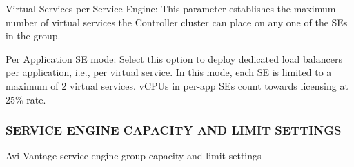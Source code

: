 \documentclass[letterpaper,10pt,english]{sphinxmanual}
\begin{document}
Virtual Services per Service Engine: This parameter establishes the maximum number of virtual services the Controller cluster can place on any one of the SEs in the group.

Per Application SE mode: Select this option to deploy dedicated load balancers per application, i.e., per virtual service. In this mode, each SE is limited to a maximum of 2 virtual services. vCPUs in per-app SEs count towards licensing at 25\% rate.


\subsubsection{SERVICE ENGINE CAPACITY AND LIMIT SETTINGS}
\label{\detokenize{getting_started/service_engine_group:service-engine-capacity-and-limit-settings}}
Avi Vantage service engine group capacity and limit settings
\end{document}
